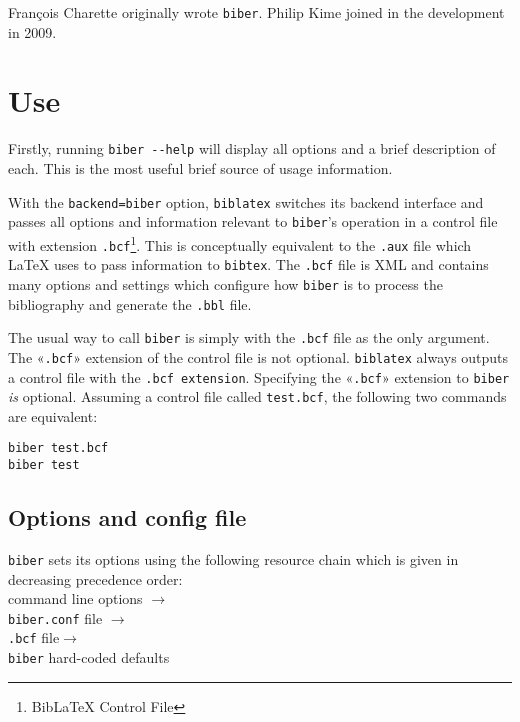 \documentclass{ltxdockit}
\begin{document}
François Charette originally wrote \verb+biber+. Philip Kime joined in
the development in 2009.

\section{Use}

Firstly, running \verb+biber --help+ will display all options and a brief
description of each. This is the most useful brief source of usage
information.

With the \verb+backend=biber+ option, \verb+biblatex+ switches its backend
interface and passes all options and information relevant to \verb+biber+'s
operation in a control file with extension \verb+.bcf+\footnote{BibLaTeX Control
  File}. This is conceptually equivalent to the \verb+.aux+ file which
LaTeX uses to pass information to \verb+bibtex+. The \verb+.bcf+ file is
XML and contains many options and settings which configure how \verb+biber+
is to process the bibliography and generate the \verb+.bbl+ file.

The usual way to call \verb+biber+ is simply with the \verb+.bcf+ file
as the only argument. The «\verb+.bcf+» extension of the control file
is not optional. \verb+biblatex+ always outputs a control file with
the \verb+.bcf extension+. Specifying the «\verb+.bcf+» extension to
\verb+biber+ \emph{is} optional. Assuming a control file called
\verb+test.bcf+, the following two commands are equivalent:

\begin{verbatim}
biber test.bcf
biber test
\end{verbatim}

\subsection{Options and config file}
\verb+biber+ sets its options using the following resource 
chain which is given in decreasing precedence order:\\[2ex]

\noindent command line options $\rightarrow$\\
\hspace*{1em}\verb+biber.conf+ file $\rightarrow$\\
\hspace*{2em}\verb+.bcf+ file$\rightarrow$\\
\hspace*{3em}\verb+biber+ hard-coded defaults\\[2ex]
\end{document}

